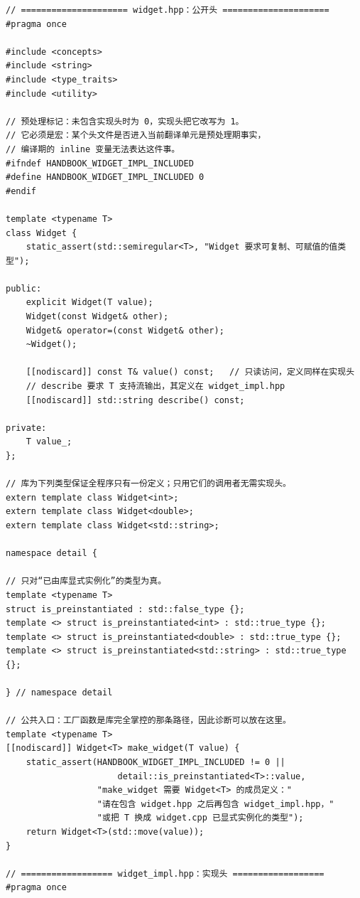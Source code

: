 \documentclass[12pt,a4paper,fontset=fandol]{ctexbook}
\begin{document}
\begin{lstlisting}[style=cppstyle,caption={双头文件拆分：公开头、实现头与实例化单元的三段式布局}]
// ===================== widget.hpp：公开头 =====================
#pragma once

#include <concepts>
#include <string>
#include <type_traits>
#include <utility>

// 预处理标记：未包含实现头时为 0，实现头把它改写为 1。
// 它必须是宏：某个头文件是否进入当前翻译单元是预处理期事实，
// 编译期的 inline 变量无法表达这件事。
#ifndef HANDBOOK_WIDGET_IMPL_INCLUDED
#define HANDBOOK_WIDGET_IMPL_INCLUDED 0
#endif

template <typename T>
class Widget {
    static_assert(std::semiregular<T>, "Widget 要求可复制、可赋值的值类型");

public:
    explicit Widget(T value);
    Widget(const Widget& other);
    Widget& operator=(const Widget& other);
    ~Widget();

    [[nodiscard]] const T& value() const;   // 只读访问，定义同样在实现头
    // describe 要求 T 支持流输出，其定义在 widget_impl.hpp
    [[nodiscard]] std::string describe() const;

private:
    T value_;
};

// 库为下列类型保证全程序只有一份定义；只用它们的调用者无需实现头。
extern template class Widget<int>;
extern template class Widget<double>;
extern template class Widget<std::string>;

namespace detail {

// 只对“已由库显式实例化”的类型为真。
template <typename T>
struct is_preinstantiated : std::false_type {};
template <> struct is_preinstantiated<int> : std::true_type {};
template <> struct is_preinstantiated<double> : std::true_type {};
template <> struct is_preinstantiated<std::string> : std::true_type {};

} // namespace detail

// 公共入口：工厂函数是库完全掌控的那条路径，因此诊断可以放在这里。
template <typename T>
[[nodiscard]] Widget<T> make_widget(T value) {
    static_assert(HANDBOOK_WIDGET_IMPL_INCLUDED != 0 ||
                      detail::is_preinstantiated<T>::value,
                  "make_widget 需要 Widget<T> 的成员定义："
                  "请在包含 widget.hpp 之后再包含 widget_impl.hpp，"
                  "或把 T 换成 widget.cpp 已显式实例化的类型");
    return Widget<T>(std::move(value));
}

// ================== widget_impl.hpp：实现头 ==================
#pragma once


\end{lstlisting}
\end{document}
